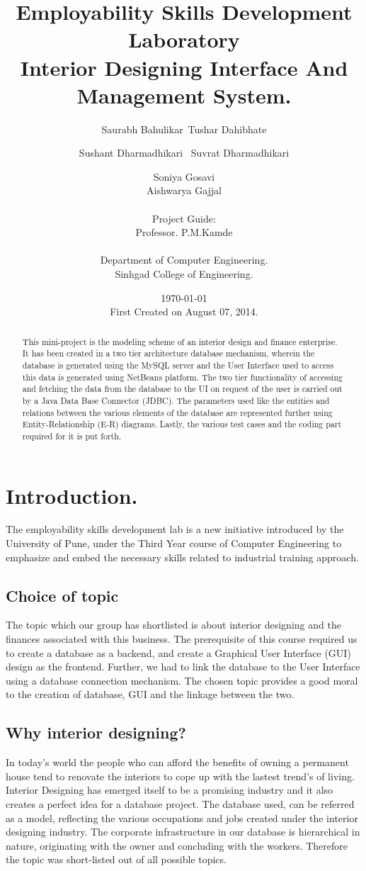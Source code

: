 \documentclass[12pt,a4paper]{report}
\title{Employability Skills Development Laboratory \\ \Large Interior Designing Interface And Management System.}
\author{ Saurabh Bahulikar\ Tushar Dahibhate \and Sushant Dharmadhikari \ Suvrat Dharmadhikari \and Soniya Gosavi \\ Aishwarya Gajjal\\\\  Project Guide: \\ Professor. P.M.Kamde \\\\ Department of Computer Engineering. \\ Sinhgad College of Engineering.}
\date{\today \\ First Created on August 07, 2014.}
\begin{document}
\maketitle
\begin{abstract}
This mini-project is the modeling scheme of an interior design and finance enterprise. It has been created in a two tier architecture database mechanism, wherein the database is generated using the MySQL server and the User Interface used to access this data is generated using NetBeans platform. The two tier functionality of accessing and fetching the data from the database to the UI on request of the user is carried out by a Java Data Base Connector (JDBC). The parameters used like the entities and relations between the various elements of the database are represented further using Entity-Relationship (E-R) diagrams. Lastly, the various test cases and the coding part required for it is put forth.
\end{abstract}

\tableofcontents

\chapter{Introduction.}%
The employability skills development lab is a new initiative introduced by the University of Pune, under the Third Year course of Computer Engineering to emphasize and embed the necessary skills related to industrial training approach.

\section{Choice of topic}
The topic which our group has shortlisted is about interior designing and the finances associated with this business. The prerequisite of this course required us to create a database as a backend, and create a Graphical User Interface (GUI) design as the frontend. Further, we had to link the database to the User Interface using a database connection mechanism. The chosen topic provides a good moral to the creation of database, GUI and the linkage between the two.

\section{Why interior designing?}
In today's world the people who can afford the benefits of owning a permanent house tend to renovate the interiors to cope up with the lastest trend's of living. Interior Designing has emerged itself to be a promising industry and it also creates a perfect idea for a database project. The database used, can be referred as a model, reflecting the various occupations and jobs created under the interior designing industry. The corporate infrastructure in our database is hierarchical in nature, originating with the owner and concluding with the workers. Therefore the topic was short-listed out of all possible topics. 
\end{document}
